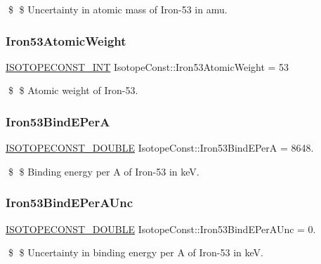 \$ \$ Uncertainty in atomic mass of Iron-\/53 in amu. \mbox{\label{group___isotope_const-_iron-_fe53_ga747a9d7a27e3813bbc4296f4eea2a745}} 
\subsubsection{\texorpdfstring{Iron53\+Atomic\+Weight}{Iron53AtomicWeight}}
{\footnotesize\ttfamily \mbox{\hyperlink{group___isotope_const-_macros_ga5f18360b3e99483a35c32d789e62621c}{I\+S\+O\+T\+O\+P\+E\+C\+O\+N\+S\+T\+\_\+\+I\+NT}} Isotope\+Const\+::\+Iron53\+Atomic\+Weight = 53}

\$ \$ Atomic weight of Iron-\/53. \mbox{\label{group___isotope_const-_iron-_fe53_ga5fb3384d3c45a99bc5b046f1e07a08bc}} 
\subsubsection{\texorpdfstring{Iron53\+Bind\+E\+PerA}{Iron53BindEPerA}}
{\footnotesize\ttfamily \mbox{\hyperlink{group___isotope_const-_macros_ga8f45a7272ce02c0b4c65c44636ed719a}{I\+S\+O\+T\+O\+P\+E\+C\+O\+N\+S\+T\+\_\+\+D\+O\+U\+B\+LE}} Isotope\+Const\+::\+Iron53\+Bind\+E\+PerA = 8648.}

\$ \$ Binding energy per A of Iron-\/53 in keV. \mbox{\label{group___isotope_const-_iron-_fe53_ga9aea6d5a48537c3c7c055f923e09897f}} 
\subsubsection{\texorpdfstring{Iron53\+Bind\+E\+Per\+A\+Unc}{Iron53BindEPerAUnc}}
{\footnotesize\ttfamily \mbox{\hyperlink{group___isotope_const-_macros_ga8f45a7272ce02c0b4c65c44636ed719a}{I\+S\+O\+T\+O\+P\+E\+C\+O\+N\+S\+T\+\_\+\+D\+O\+U\+B\+LE}} Isotope\+Const\+::\+Iron53\+Bind\+E\+Per\+A\+Unc = 0.}

\$ \$ Uncertainty in binding energy per A of Iron-\/53 in keV. \mbox{\label{group___isotope_const-_iron-_fe53_gaefd55c518ecf69aa0fd2adb29cdfa2c0}} 
